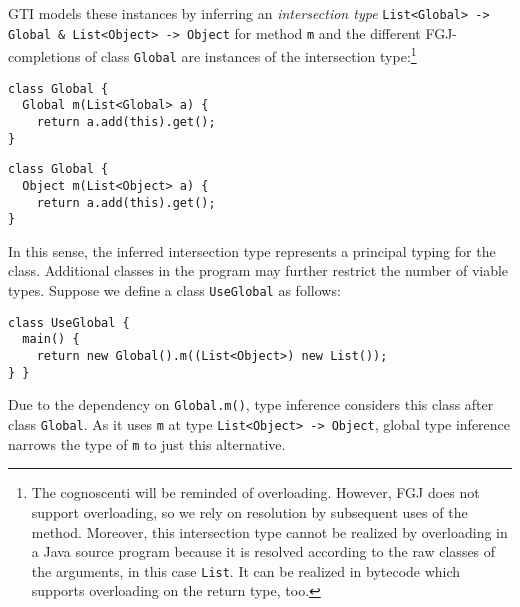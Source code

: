 GTI models these instances by inferring an \emph{intersection type}
\texttt{List<Global> -> Global \& List<Object> -> Object}
for method \texttt{m} and the different FGJ-completions of class \texttt{Global} are
instances of the intersection type:\footnote{The cognoscenti will be
  reminded of overloading. However, FGJ does not support overloading,
  so we rely on resolution by subsequent uses of the method. Moreover,
  this intersection type cannot be realized by overloading in a Java
  source program because it is resolved according to the raw classes
  of the arguments, in this case \lstinline{List}. It can be realized
  in bytecode which supports overloading on the return type, too.%
}
\begin{center}
  \begin{minipage}{0.49\linewidth}
\begin{lstlisting}[style=fgj]
class Global {
  Global m(List<Global> a) {
    return a.add(this).get();
}
\end{lstlisting}
  \end{minipage}
  \begin{minipage}{0.49\linewidth}
\begin{lstlisting}[style=fgj]
class Global {
  Object m(List<Object> a) {
    return a.add(this).get();
}
\end{lstlisting}
  \end{minipage}
\end{center}
In this sense, the inferred intersection type represents a principal
typing for the class.
Additional classes in the program may further restrict the number of
viable types. Suppose we define a class \texttt{UseGlobal} as
follows:
\begin{lstlisting}[style=tfgj]
class UseGlobal {
  main() {
    return new Global().m((List<Object>) new List());
} }
\end{lstlisting}
Due to the dependency on \texttt{Global.m()}, type inference considers this class after class
\texttt{Global}. As it uses \texttt{m} at type
\texttt{List<Object> -> Object}, global type inference narrows the
type of \texttt{m} to just this alternative.


